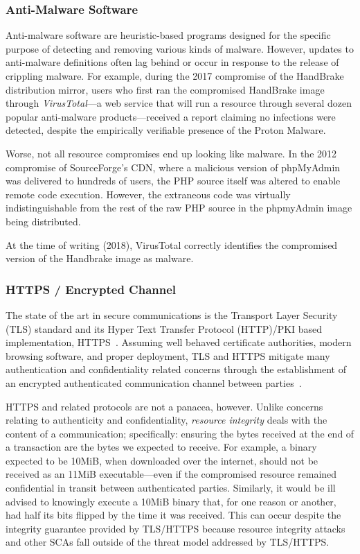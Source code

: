 \subsubsection{Anti-Malware Software}

Anti-malware software are heuristic-based programs designed for the specific
purpose of detecting and removing various kinds of malware. However, updates to
anti-malware definitions often lag behind or occur in response to the release of
crippling malware. For example, during the 2017 compromise of the HandBrake
distribution mirror, users who first ran the compromised HandBrake image
through \textit{VirusTotal}---a web service that will run a resource through
several dozen popular anti-malware products---received a report claiming no
infections were detected, despite the empirically verifiable presence of the
Proton Malware.

Worse, not all resource compromises end up looking like malware. In the 2012
compromise of SourceForge's CDN, where a malicious version of phpMyAdmin was
delivered to hundreds of users, the PHP source itself was altered to enable
remote code execution. However, the extraneous code was virtually
indistinguishable from the rest of the raw PHP source in the phpmyAdmin image
being distributed.

At the time of writing (2018), VirusTotal correctly identifies the compromised
version of the Handbrake image as malware.

\subsubsection{HTTPS / Encrypted Channel}

The state of the art in secure communications is the Transport Layer Security
(TLS) standard and its Hyper Text Transfer Protocol (HTTP)/PKI based
implementation, HTTPS~\cite{TLS1.2, HTTPS, PKI}. Assuming well behaved
certificate authorities, modern browsing software, and proper deployment, TLS
and HTTPS mitigate many authentication and confidentiality related concerns
through the establishment of an encrypted authenticated communication channel
between parties~\cite{HTTPS, TLS1.2, DTLS}.

HTTPS and related protocols are not a panacea, however. Unlike concerns relating
to authenticity and confidentiality, \textit{resource integrity} deals with the
content of a communication; specifically: ensuring the bytes received at the end
of a transaction are the bytes we expected to receive. For example, a binary
expected to be 10MiB, when downloaded over the internet, should not be received
as an 11MiB executable---even if the compromised resource remained confidential
in transit between authenticated parties. Similarly, it would be ill advised to
knowingly execute a 10MiB binary that, for one reason or another, had half its
bits flipped by the time it was received. This can occur despite the integrity
guarantee provided by TLS/HTTPS because resource integrity attacks and other
SCAs fall outside of the threat model addressed by TLS/HTTPS.

